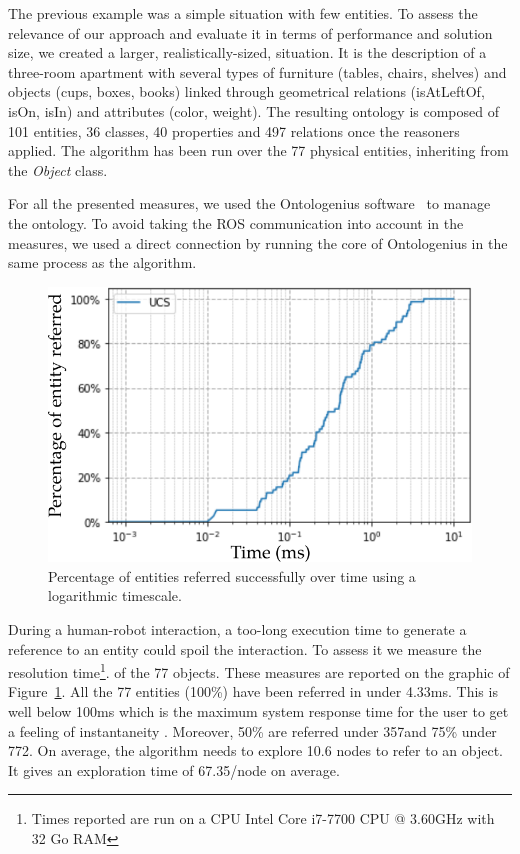 The previous example was a simple situation with few entities. To assess the relevance of our approach and evaluate it in terms of performance and solution size, we created a larger, realistically-sized, situation. It is the description of a three-room apartment with several types of furniture (tables, chairs, shelves) and objects (cups, boxes, books) linked through geometrical relations (isAtLeftOf, isOn, isIn) and attributes (color, weight). The resulting ontology is composed of 101 entities, 36 classes, 40 properties and 497 relations once the reasoners applied. The algorithm has been run over the 77 physical entities, inheriting from the \textit{Object} class.

For all the presented measures, we used the Ontologenius software~\cite{sarthou_2019_ontologenius} to manage the ontology. To avoid taking the ROS communication into account in the measures, we used a direct connection by running the core of Ontologenius in the same process as the algorithm.

\begin{figure}[h!]
\centering
\includegraphics[scale=0.50]{figures/chapter4/scaling_up_percentage.png}
\caption{\label{fig:chap4_percentage} Percentage of entities referred successfully over time using a logarithmic timescale. }
\end{figure}

During a human-robot interaction, a too-long execution time to generate a reference to an entity could spoil the interaction. To assess it we measure the resolution time\footnote{Times reported are run on a CPU Intel Core i7-7700 CPU @ 3.60GHz with 32 Go RAM}. of the 77 objects. These measures are reported on the graphic of Figure~\ref{fig:chap4_percentage}. All the 77 entities (100\%) have been referred in under 4.33ms. This is well below 100ms which is the maximum system response time for the user to get a feeling of instantaneity \cite{miller_1968_response}. Moreover, 50\% are referred under 357\us and 75\% under 772\us. On average, the algorithm needs to explore 10.6 nodes to refer to an object. It gives an exploration time of 67.35\us/node on average.

